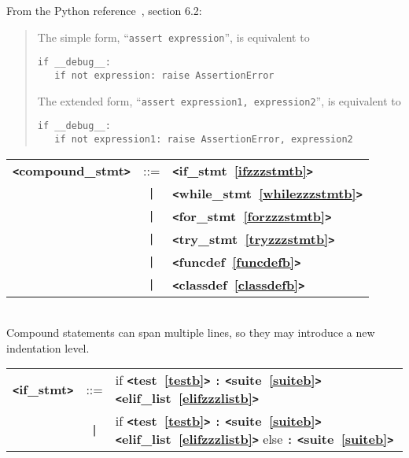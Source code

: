 From the Python reference~\cite{pythonlang}, section 6.2:
\begin{quote}
The simple form, ``\verb|assert expression|'', is equivalent to 
\begin{verbatim}
if __debug__:
   if not expression: raise AssertionError
\end{verbatim}

 The extended form, ``\verb|assert expression1, expression2|'', is equivalent to 
\begin{verbatim}
if __debug__:
   if not expression1: raise AssertionError, expression2
\end{verbatim}
\end{quote}

\label{compoundzzzstmtb}
\settowidth{\tw}{compound\_stmt  ::=  }
\addtolength{\tw}{2\arraycolsep}
\setlength{\len}{\textwidth}
\addtolength{\len}{-1\tw}
\begin{tabular}{lcp{\len}}
{\bf \verb+<+compound\_stmt\verb+>+} & ::=  & {\bf \verb+<+if\_stmt~\ref{ifzzzstmtb}\verb+>+}  \\
 & \verb+|+  & {\bf \verb+<+while\_stmt~\ref{whilezzzstmtb}\verb+>+}  \\
 & \verb+|+  & {\bf \verb+<+for\_stmt~\ref{forzzzstmtb}\verb+>+}  \\
 & \verb+|+  & {\bf \verb+<+try\_stmt~\ref{tryzzzstmtb}\verb+>+}  \\
 & \verb+|+  & {\bf \verb+<+funcdef~\ref{funcdefb}\verb+>+}  \\
 & \verb+|+  & {\bf \verb+<+classdef~\ref{classdefb}\verb+>+}  \\
\end{tabular} \\

Compound statements can span multiple lines, so they may introduce a new indentation level.

\label{ifzzzstmtb}

\settowidth{\tw}{if\_stmt  ::=  }
\addtolength{\tw}{2\arraycolsep}

\setlength{\len}{\textwidth}
\addtolength{\len}{-1\tw}
\begin{tabular}{lcp{\len}}
{\bf \verb+<+if\_stmt\verb+>+} & ::=  & if {\bf \verb+<+test~\ref{testb}\verb+>+}  \verb|:| {\bf \verb+<+suite~\ref{suiteb}\verb+>+}  {\bf \verb+<+elif\_list~\ref{elifzzzlistb}\verb+>+}  \\
 & \verb+|+  & if {\bf \verb+<+test~\ref{testb}\verb+>+}  \verb|:| {\bf \verb+<+suite~\ref{suiteb}\verb+>+}  {\bf \verb+<+elif\_list~\ref{elifzzzlistb}\verb+>+}  else \verb|:| {\bf \verb+<+suite~\ref{suiteb}\verb+>+}  \\
\end{tabular}

